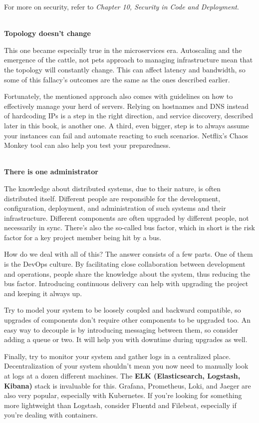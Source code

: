 For more on security, refer to \textit{Chapter 10, Security in Code and Deployment}.


\hspace*{\fill} \\ %
\noindent
\textbf{Topology doesn't change}

This one became especially true in the microservices era. Autoscaling and the emergence of the cattle, not pets approach to managing infrastructure mean that the topology will constantly change. This can affect latency and bandwidth, so some of this fallacy's outcomes are the same as the ones described earlier.

Fortunately, the mentioned approach also comes with guidelines on how to effectively manage your herd of servers. Relying on hostnames and DNS instead of hardcoding IPs is a step in the right direction, and service discovery, described later in this book, is another one. A third, even bigger, step is to always assume your instances can fail and automate reacting to such scenarios. Netflix's Chaos Monkey tool can also help you test your preparedness.


\hspace*{\fill} \\ %
\noindent
\textbf{There is one administrator}

The knowledge about distributed systems, due to their nature, is often distributed itself. Different people are responsible for the development, configuration, deployment, and administration of such systems and their infrastructure. Different components are often upgraded by different people, not necessarily in sync. There's also the so-called bus factor, which in short is the risk factor for a key project member being hit by a bus.

How do we deal with all of this? The answer consists of a few parts. One of them is the DevOps culture. By facilitating close collaboration between development and operations, people share the knowledge about the system, thus reducing the bus factor. Introducing continuous delivery can help with upgrading the project and keeping it always up.

Try to model your system to be loosely coupled and backward compatible, so upgrades of components don't require other components to be upgraded too. An easy way to decouple is by introducing messaging between them, so consider adding a queue or two. It will help you with downtime during upgrades as well.

Finally, try to monitor your system and gather logs in a centralized place. Decentralization of your system shouldn't mean you now need to manually look at logs at a dozen different machines. The \textbf{ELK (Elasticsearch, Logstash, Kibana)} stack is invaluable for this. Grafana, Prometheus, Loki, and Jaeger are also very popular, especially with Kubernetes. If you're looking for something more lightweight than Logstash, consider Fluentd and Filebeat, especially if you're dealing with containers.

